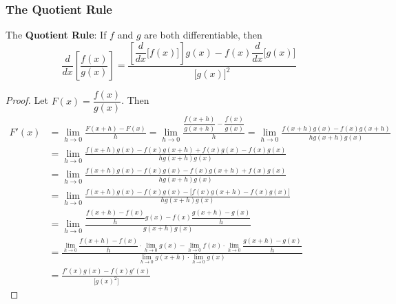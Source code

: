 \subsubsection*{The Quotient Rule}
The \textbf{Quotient Rule}: If \(f\) and \(g\) are both differentiable, then
\[\frac{d}{dx}\left[\frac{f(x)}{g(x)}\right]
=\frac{\left[\dfrac{d}{dx}\bigl[f(x)\bigr]\right]g(x)
-f(x)\dfrac{d}{dx}\bigl[g(x)\bigr]}{\bigl[g(x)\bigr]^2}\]
\begin{proof}
    Let \(F(x)=\dfrac{f(x)}{g(x)}\).
    Then
    \allowdisplaybreaks
    \begin{align*}
        F'(x) 
        &= \lim_{h\to 0}\frac{F(x+h)-F(x)}{h}
        =\lim_{h\to 0}\frac{\dfrac{f(x+h)}{g(x+h)}-\dfrac{f(x)}{g(x)}}{h}
        =\lim_{h\to 0}\frac{f(x+h)g(x)-f(x)g(x+h)}{hg(x+h)g(x)} \\
        &= \lim_{h\to 0}
        \frac{f(x+h)g(x)-f(x)g(x+h)+f(x)g(x)-f(x)g(x)}{hg(x+h)g(x)} \\
        &= \lim_{h\to 0}
        \frac{f(x+h)g(x)-f(x)g(x)-f(x)g(x+h)+f(x)g(x)}{hg(x+h)g(x)} \\
        &= \lim_{h\to 0}
        \frac{f(x+h)g(x)-f(x)g(x)
        -\bigl[f(x)g(x+h)-f(x)g(x)\bigr]}{hg(x+h)g(x)} \\
        &= \lim_{h\to 0}
        \frac{\dfrac{f(x+h)-f(x)}{h}g(x)
        -f(x)\dfrac{g(x+h)-g(x)}{h}}{g(x+h)g(x)} \\
        &= {\frac{\displaystyle{\lim_{h\to 0}}
        \dfrac{f(x+h)-f(x)}{h}\cdot\displaystyle{\lim_{h\to 0}}g(x)
        -\displaystyle{\lim_{h\to 0}}f(x)\cdot\displaystyle{\lim_{h\to 0}}
        \dfrac{g(x+h)-g(x)}{h}}{\displaystyle{\lim_{h\to 0}}g(x+h)
        \cdot\displaystyle{\lim_{h\to 0}}g(x)}} \\
        &= \frac{f'(x)g(x)-f(x)g'(x)}{\bigl[g(x)^2\bigr]}
    \end{align*}
\end{proof}

